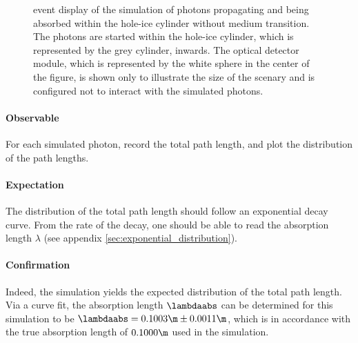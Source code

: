 


\begin{figure}[htb]
  \caption{ event display of the simulation of photons propagating and being absorbed within the hole-ice cylinder without medium transition. The photons are started within the hole-ice cylinder, which is represented by the grey cylinder, inwards. The optical detector module, which is represented by the white sphere in the center of the figure, is shown only to illustrate the size of the scenary and is configured not to interact with the simulated photons.}
\end{figure}

\paragraph{Observable} For each simulated photon, record the total path length, and plot the distribution of the path lengths.

\paragraph{Expectation} The distribution of the total path length should follow an exponential decay curve. From the rate of the decay, one should be able to read the absorption length $\lambda$ (see appendix \ref{sec:exponential_distribution}).

\paragraph{Confirmation} Indeed, the simulation yields the expected distribution of the total path length. Via a curve fit, the absorption length $\lambdaabs$ can be determined for this simulation to be $\lambdaabs = 0.1003\m \pm 0.0011\m$, which is in accordance with the true absorption length of $0.1000\m$ used in the simulation.



